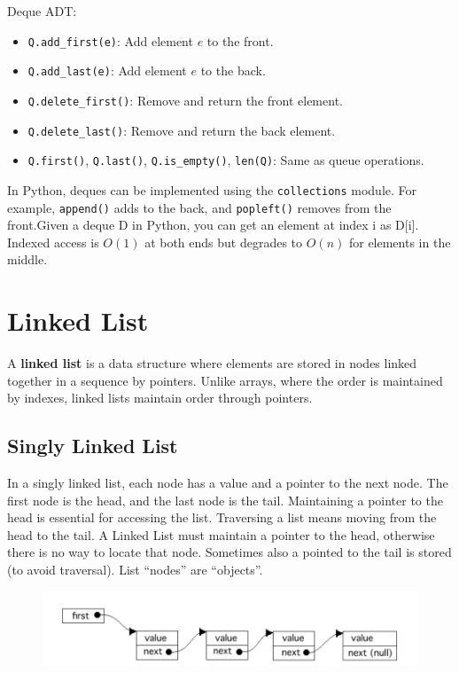     Deque ADT:
    \begin{itemize}
        \item \texttt{Q.add\_first(e)}: Add element \(e\) to the front.
        \item \texttt{Q.add\_last(e)}: Add element \(e\) to the back.
        \item \texttt{Q.delete\_first()}: Remove and return the front element.
        \item \texttt{Q.delete\_last()}: Remove and return the back element.
        \item \texttt{Q.first()}, \texttt{Q.last()}, \texttt{Q.is\_empty()}, \texttt{len(Q)}: Same as queue operations.
    \end{itemize}
    
    In Python, deques can be implemented using the \texttt{collections} module. For example, \texttt{append()} adds to the back, and \texttt{popleft()} removes from the front.Given a deque D in Python, you can get an element at index i as D[i]. Indexed access is \(O(1)\) at both ends but degrades to \(O(n)\) for elements in the middle.
    
    \section{Linked List}
    A \textbf{linked list} is a data structure where elements are stored in nodes linked together in a sequence by pointers. Unlike arrays, where the order is maintained by indexes, linked lists maintain order through pointers.
    
    \subsection{Singly Linked List}
    In a singly linked list, each node has a value and a pointer to the next node. The first node is the head, and the last node is the tail. Maintaining a pointer to the head is essential for accessing the list. Traversing a list means moving from the head to the tail. A Linked List must maintain a pointer to the head, otherwise there is no way to locate that node. Sometimes also a pointed to the tail is stored (to avoid traversal). List “nodes” are “objects”.

    

    \begin{figure}[H]
        \centering
        \includegraphics[width=0.5\linewidth]{immagini/singly linked list.JPG}
        \label{fig:enter-label}
    \end{figure}

